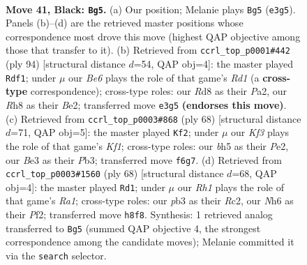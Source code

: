 \documentclass[11pt]{article}
\begin{document}
\clearpage

\begin{figure}[p]\centering
\begin{subfigure}{0.46\textwidth}\centering
\resizebox{\linewidth}{!}{%
\newchessgame
\chessboard[
  setfen={3r3r/p6p/5k1n/7B/P7/1Pp1b1BP/R1P3PK/1R6 b - - 4 41},
  showmover=false,
  pgfstyle=straightmove, color=movearrow, markmove={e3-g5}
]}
\caption{}
\end{subfigure}\hfill
\begin{subfigure}{0.46\textwidth}\centering
\resizebox{\linewidth}{!}{%
\newchessgame
\chessboard[
  setfen={8/2k1r2p/1pb3p1/p1n5/2P1pR2/7P/P3B1P1/3R2K1 w - - 6 48},
  showmover=false,
  pgfstyle=straightmove, color=movearrow, markmove={d1-f1}
]}
\caption{}
\end{subfigure}
\\[4pt]
\begin{subfigure}{0.46\textwidth}\centering
\resizebox{\linewidth}{!}{%
\newchessgame
\chessboard[
  setfen={8/p1r2pk1/1p2pbp1/8/P7/1P1RPBPP/4P3/5K2 w - - 5 35},
  showmover=false,
  pgfstyle=straightmove, color=movearrow, markmove={f1-f2}
]}
\caption{}
\end{subfigure}\hfill
\begin{subfigure}{0.46\textwidth}\centering
\resizebox{\linewidth}{!}{%
\newchessgame
\chessboard[
  setfen={3rk3/p3pp1p/1p1b2p1/8/P7/7P/2R2PP1/R6K w - - 0 35},
  showmover=false,
  pgfstyle=straightmove, color=movearrow, markmove={a1-d1}
]}
\caption{}
\end{subfigure}
\caption{\textbf{Move 41, Black: \texttt{Bg5}.} (a) Our position; Melanie plays \texttt{Bg5} (\texttt{e3g5}). Panels (b)--(d) are the retrieved master positions whose correspondence most drove this move (highest QAP objective among those that transfer to it). (b) Retrieved from \texttt{ccrl\_top\_p0001\#442} (ply 94) [structural distance $d$=54, QAP obj=4]: the master played \texttt{Rdf1}; under $\mu$ our \emph{Be6} plays the role of that game's \emph{Rd1} (a \textbf{cross-type} correspondence); cross-type roles: our \emph{R}d8 as their \emph{P}a2, our \emph{R}h8 as their \emph{B}e2; transferred move \texttt{e3g5} \textbf{(endorses this move)}. (c) Retrieved from \texttt{ccrl\_top\_p0003\#868} (ply 68) [structural distance $d$=71, QAP obj=5]: the master played \texttt{Kf2}; under $\mu$ our \emph{Kf3} plays the role of that game's \emph{Kf1}; cross-type roles: our \emph{b}h5 as their \emph{P}e2, our \emph{B}e3 as their \emph{P}b3; transferred move \texttt{f6g7}. (d) Retrieved from \texttt{ccrl\_top\_p0003\#1560} (ply 68) [structural distance $d$=68, QAP obj=4]: the master played \texttt{Rd1}; under $\mu$ our \emph{Rh1} plays the role of that game's \emph{Ra1}; cross-type roles: our \emph{p}b3 as their \emph{R}c2, our \emph{N}h6 as their \emph{P}f2; transferred move \texttt{h8f8}. Synthesis: 1 retrieved analog transferred to \texttt{Bg5} (summed QAP objective 4, the strongest correspondence among the candidate moves); Melanie committed it via the \texttt{search} selector.}
\label{fig:thought-m81}
\end{figure}
\end{document}
